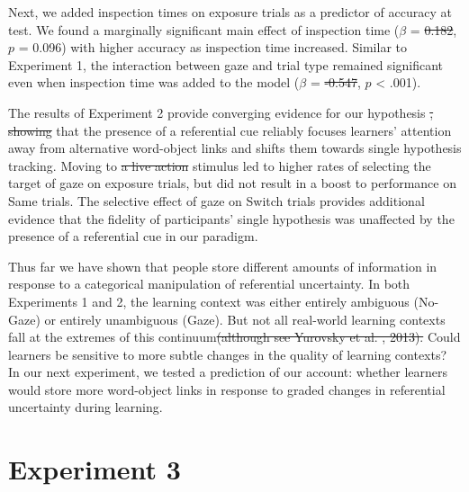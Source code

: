 \documentclass[authoryear, review]{elsarticle}
\providecommand{\DIFaddtex}[1]{{\protect\color{blue}\uwave{#1}}} %
\providecommand{\DIFdeltex}[1]{{\protect\color{red}\sout{#1}}}                      %
\providecommand{\DIFaddbegin}{} %
\providecommand{\DIFaddend}{} %
\providecommand{\DIFdelbegin}{} %
\providecommand{\DIFdelend}{} %
\providecommand{\DIFadd}[1]{\texorpdfstring{\DIFaddtex{#1}}{#1}} %
\providecommand{\DIFdel}[1]{\texorpdfstring{\DIFdeltex{#1}}{}} %
\begin{document}
Next, we added inspection times on exposure trials as a predictor of
accuracy at test. We found a marginally significant main effect of
inspection time (\(\beta\) = \DIFdelbegin \DIFdel{0.182}\DIFdelend \DIFaddbegin \DIFadd{0.18}\DIFaddend , \(p\) = 0.096) with higher accuracy
as inspection time increased. Similar to Experiment 1, the interaction
between gaze and trial type remained significant even when inspection
time was added to the model (\(\beta\) = \DIFdelbegin \DIFdel{-0.547}\DIFdelend \DIFaddbegin \DIFadd{-0.55}\DIFaddend , \(p\) \textless{} .001).

The results of Experiment 2 provide converging evidence for our
hypothesis \DIFdelbegin \DIFdel{, showing }\DIFdelend that the presence of a referential cue reliably focuses
learners' attention away from alternative word-object links and shifts
them towards single hypothesis tracking. Moving to \DIFdelbegin \DIFdel{a live action
}\DIFdelend \DIFaddbegin \DIFadd{the video }\DIFaddend stimulus
led to higher rates of selecting the target of gaze on exposure trials,
but did not result in a boost to performance on Same trials. The
selective effect of gaze on Switch trials provides additional evidence
that the fidelity of participants' single hypothesis was unaffected by
the presence of a referential cue in our paradigm.

Thus far we have shown that people store different amounts of
information in response to a categorical manipulation of referential
uncertainty. In both Experiments 1 and 2, the learning context was
either entirely ambiguous (No-Gaze) or entirely unambiguous (Gaze). But
not all real-world learning contexts fall at the extremes of this
continuum\DIFdelbegin \DIFdel{(although see Yurovsky et al. , 2013). }\DIFdelend \DIFaddbegin \DIFadd{. }\DIFaddend Could learners be sensitive to more subtle changes in the
quality of learning contexts? In our next experiment, we tested a
prediction of our account: whether learners would store more word-object
links in response to graded changes in referential uncertainty during
learning.

\section{Experiment 3}\label{experiment-3}
\end{document}
